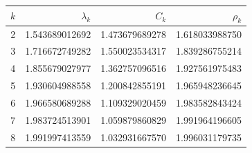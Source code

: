 \begin{center}
\begin{tabular}{@{}rrrr@{}}
\toprule
$k$ & $\lambda_k$ & $C_k$ & $\rho_k$\\
\midrule
2 & 1.543689012692 & 1.473679689278 & 1.618033988750\\
3 & 1.716672749282 & 1.550023534317 & 1.839286755214\\
4 & 1.855679027977 & 1.362757096516 & 1.927561975483\\
5 & 1.930604988558 & 1.200842855191 & 1.965948236645\\
6 & 1.966580689288 & 1.109329020459 & 1.983582843424\\
7 & 1.983724513901 & 1.059879860829 & 1.991964196605\\
8 & 1.991997413559 & 1.032931667570 & 1.996031179735\\
\bottomrule
\end{tabular}
\end{center}
